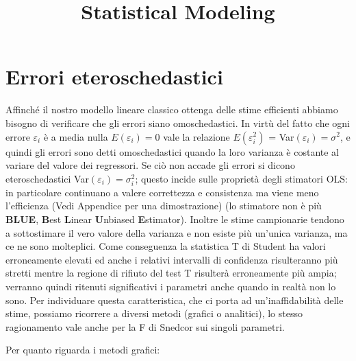 \documentclass[a4page, 11pt]{article} %
\title{Statistical Modeling}
\author{}
\date{}
\begin{document}
\maketitle

\section{Errori eteroschedastici}
Affinché il nostro modello lineare classico ottenga delle stime efficienti abbiamo bisogno di verificare che gli errori siano omoschedastici. 
In virtù del fatto che ogni errore $\varepsilon_i$ è a media nulla $E(\varepsilon_i) = 0$ vale la relazione $E(\varepsilon_i^2)$ = Var$(\varepsilon_i) = \sigma^2$, e quindi gli errori sono detti omoschedastici quando la loro varianza è costante al variare del valore dei regressori.
Se ciò non accade gli errori si dicono eteroschedastici Var$(\varepsilon_i) = \sigma_i^2$; questo incide sulle proprietà degli stimatori OLS: in particolare continuano a valere correttezza e consistenza ma viene meno l’efficienza (Vedi Appendice per una dimostrazione) %
(lo stimatore non è più \textbf{BLUE}, \textbf{B}est \textbf{L}inear \textbf{U}nbiased \textbf{E}stimator). 
Inoltre le stime campionarie tendono a sottostimare il vero valore della varianza e non esiste più un’unica varianza, ma ce ne sono molteplici. 
Come conseguenza la statistica T di Student ha valori erroneamente elevati ed anche i relativi intervalli di confidenza risulteranno più stretti mentre la regione di rifiuto del test T risulterà erroneamente più ampia; verranno quindi ritenuti significativi i parametri anche quando in realtà non lo sono. 
Per individuare questa caratteristica, che ci porta ad un’inaffidabilità delle stime, possiamo ricorrere a diversi metodi (grafici o analitici), lo stesso ragionamento vale anche per la F di Snedcor sui singoli parametri.

Per quanto riguarda i metodi grafici:
\end{document}
